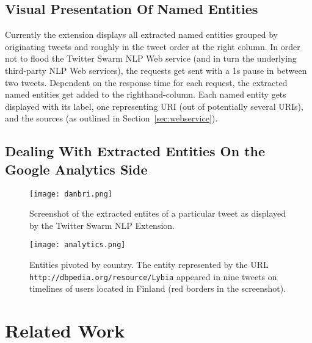 \documentclass[runningheads,a4paper]{llncs}
\begin{document}
\subsection{Visual Presentation Of Named Entities}
Currently the extension displays all extracted named entities grouped by originating tweets and roughly in the tweet order at the right column. In order not to flood the Twitter Swarm NLP Web service (and in turn the underlying third-party NLP Web services), the requests get sent with a 1s pause in between two tweets. Dependent on the response time for each request, the extracted named entities get added to the righthand-column. Each named entity gets displayed with its label, one representing URI (out of potentially several URIs), and the sources (as outlined in Section~\ref{sec:webservice}).

\subsection{Dealing With Extracted Entities On the Google Analytics Side}

\begin{figure}[h!]
  \centering
  \texttt{[image: danbri.png]}
  \caption{Screenshot of the extracted entites of a particular tweet as displayed by the Twitter Swarm NLP Extension.}
  \label{fig:danbri}
\end{figure}

\begin{figure}[h!]
  \centering
  \texttt{[image: analytics.png]}
  \caption{Entities pivoted by country. The entity represented by the URL \texttt{http://dbpedia.org/resource/Lybia} appeared in nine tweets on timelines of users located in Finland (red borders in the screenshot).}
  \label{fig:analytics}
\end{figure}

\section{Related Work}\label{sec:relatedwork}
\end{document}
